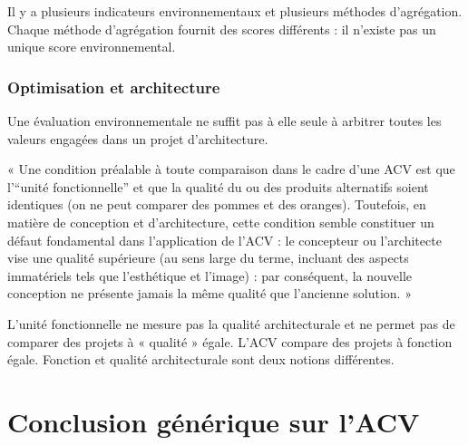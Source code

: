 Il y a plusieurs indicateurs environnementaux et plusieurs méthodes d'agrégation. Chaque méthode d'agrégation fournit des scores différents : il n'existe pas un unique score environnemental.

\subsection*{Optimisation et architecture}

Une évaluation environnementale ne suffit pas à elle seule à arbitrer toutes les valeurs engagées dans un projet d'architecture.

\begin{displayquote}
« Une condition préalable à toute comparaison dans le cadre d'une ACV est que l'“unité fonctionnelle” et que la qualité du ou des produits alternatifs soient identiques (on ne peut comparer des pommes et des oranges). Toutefois, en matière de conception et d'architecture, cette condition semble constituer un défaut fondamental dans l'application de l'ACV : le concepteur ou l'architecte vise une qualité supérieure (au sens large du terme, incluant des aspects immatériels tels que l'esthétique et l'image) : par conséquent, la nouvelle conception ne présente jamais la même qualité que l'ancienne solution. »
\end{displayquote}

L'unité fonctionnelle ne mesure pas la qualité architecturale et ne permet pas de comparer des projets à « qualité » égale. L'ACV compare des projets à fonction égale. Fonction et qualité architecturale sont deux notions différentes.

\chapter{Conclusion générique sur l'ACV}
